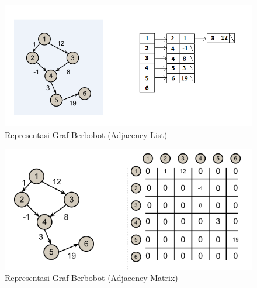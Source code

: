 \begin{itemize}
\begin{figure}[h]
\centering
\includegraphics[scale=0.9]{Gambar/weighted_list}
\caption[Representasi Graf Berbobot (Adjacency List)]{Representasi Graf Berbobot (Adjacency List)}
\label{fig:weighted_list}
\end{figure}

\clearpage
\begin{figure}[h]
\centering
\includegraphics[scale=0.9]{Gambar/weighted_matrix}
\caption[Representasi Graf Berbobot (Adjacency List)]{Representasi Graf Berbobot
(Adjacency Matrix)}
\label{fig:weighted_matrix}
\end{figure}
\end{itemize}

